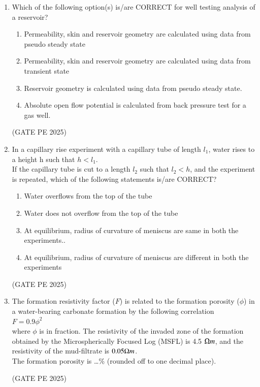 \documentclass[journal,12pt,onecolumn]{IEEEtran}
\theoremstyle{remark}
\begin{document}
\begin{enumerate}
\item Which of the following option(s) is/are CORRECT for well testing analysis of a reservoir?
\begin{enumerate}
    \item Permeability, skin and reservoir geometry are calculated using data from pseudo steady state
    \item Permeability, skin and reservoir geometry are calculated using data from transient state
    \item Reservoir geometry is calculated using data from pseudo steady state.
    \item Absolute open flow potential is calculated from back pressure test for a gas well.
\end{enumerate}
\hfill{(GATE PE 2025)}

\item In a capillary rise experiment with a capillary tube of length $l_1$, water rises to a height h such that $h<l_1$.\\
If the capillary tube is cut to a length $l_2$ such that $l_2<h$, and the experiment is repeated, which of the following statements is/are CORRECT?
\begin{enumerate}
    \item Water overflows from the top of the tube
    \item Water does not overflow from the top of the tube
    \item At equilibrium, radius of curvature of meniscus are same in both the experiments..
    \item At equilibrium, radius of curvature of meniscus are different in both the experiments
\end{enumerate}
\hfill{(GATE PE 2025)}

\item The formation resistivity factor ($F$) is related to the formation porosity ($\phi$) in a water-bearing carbonate formation by the following correlation\\
$F=0.9\phi^2$\\
where $\phi$ is in fraction. The resistivity of the invaded zone of the formation obtained by the Microspherically Focused Log (MSFL) is 4.5 $\ohm m$, and the resistivity of the mud-filtrate is $0.05 \ohm m$.\\
The formation porosity is \dots \% (rounded off to one decimal place).

\hfill{(GATE PE 2025)}


\end{enumerate}
\end{document}
